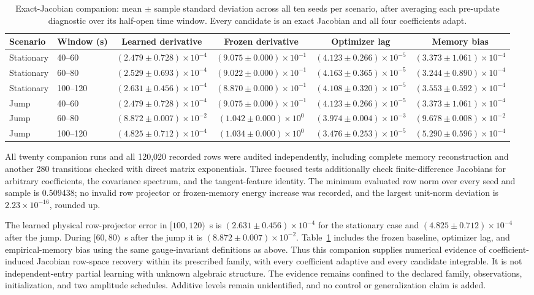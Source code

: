 \documentclass[journal]{IEEEtran}
\begin{document}
\begin{table}[t]
\centering
\caption{Exact-Jacobian companion: mean $\pm$ sample standard deviation across all ten seeds per scenario, after averaging each pre-update diagnostic over its half-open time window. Every candidate is an exact Jacobian and all four coefficients adapt.}
\label{tab:direct_jacobian_results}
\begin{tabular}{llcccc}
\toprule
Scenario & Window (s) & Learned derivative & Frozen derivative & Optimizer lag & Memory bias\\
\midrule
Stationary & 40--60 & $(2.479\pm0.728)\times10^{-4}$ & $(9.075\pm0.000)\times10^{-1}$ & $(4.123\pm0.266)\times10^{-5}$ & $(3.373\pm1.061)\times10^{-4}$\\
Stationary & 60--80 & $(2.529\pm0.693)\times10^{-4}$ & $(9.022\pm0.000)\times10^{-1}$ & $(4.163\pm0.365)\times10^{-5}$ & $(3.244\pm0.890)\times10^{-4}$\\
Stationary & 100--120 & $(2.631\pm0.456)\times10^{-4}$ & $(8.870\pm0.000)\times10^{-1}$ & $(4.108\pm0.320)\times10^{-5}$ & $(3.553\pm0.592)\times10^{-4}$\\
\midrule
Jump & 40--60 & $(2.479\pm0.728)\times10^{-4}$ & $(9.075\pm0.000)\times10^{-1}$ & $(4.123\pm0.266)\times10^{-5}$ & $(3.373\pm1.061)\times10^{-4}$\\
Jump & 60--80 & $(8.872\pm0.007)\times10^{-2}$ & $(1.042\pm0.000)\times10^{0}$ & $(3.974\pm0.004)\times10^{-3}$ & $(9.678\pm0.008)\times10^{-2}$\\
Jump & 100--120 & $(4.825\pm0.712)\times10^{-4}$ & $(1.034\pm0.000)\times10^{0}$ & $(3.476\pm0.253)\times10^{-5}$ & $(5.290\pm0.596)\times10^{-4}$\\
\bottomrule
\end{tabular}
\end{table}
%
All twenty companion runs and all 120,020 recorded rows were audited
independently, including complete memory reconstruction and another
280 transitions checked with direct matrix exponentials. Three focused
tests additionally check finite-difference Jacobians for arbitrary
coefficients, the covariance spectrum, and the tangent-feature identity.
The minimum evaluated row norm over every seed and sample is 0.509438;
no invalid row projector or frozen-memory energy increase was recorded,
and the largest unit-norm deviation is $2.23\times10^{-16}$, rounded up.

The learned physical row-projector error in $[100,120)$~s is
$(2.631\pm0.456)\times10^{-4}$ for the stationary case and
$(4.825\pm0.712)\times10^{-4}$ after the jump. During $[60,80)$~s
after the jump it is $(8.872\pm0.007)\times10^{-2}$.
Table~\ref{tab:direct_jacobian_results} includes the frozen baseline,
optimizer lag, and empirical-memory bias using the same gauge-invariant
definitions as above. Thus this companion supplies numerical evidence of
coefficient-induced Jacobian row-space recovery within its prescribed
family, with every coefficient adaptive and every candidate integrable.
It is not independent-entry partial learning with unknown algebraic structure.
The evidence remains confined to the declared family, observations,
initialization, and two amplitude schedules. Additive levels remain
unidentified, and no control or generalization claim is added.
%
\end{document}
